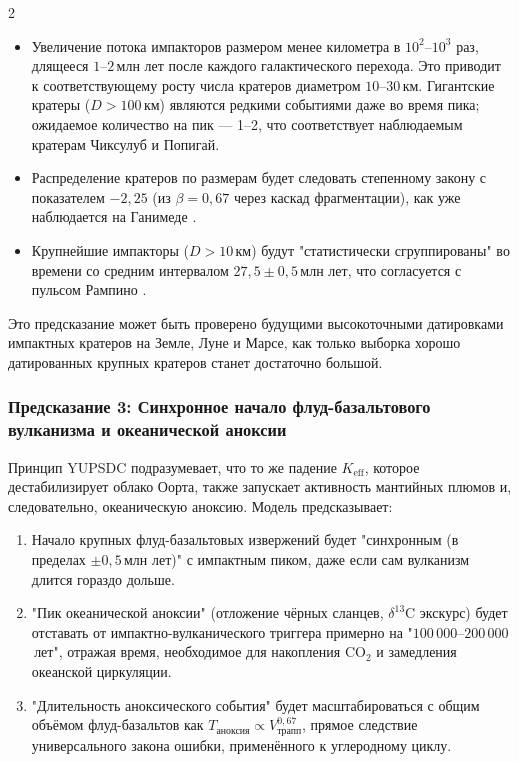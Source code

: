 \documentclass[11pt,a4paper]{article}
\begin{document}
\begin{multicols}{2}
		\begin{itemize}
			\item Увеличение потока импакторов размером менее километра в \(10^{2}\)–\(10^{3}\) раз, длящееся \(1\)–\(2\) млн лет после каждого галактического перехода. Это приводит к соответствующему росту числа кратеров диаметром \(10\)–\(30\) км. Гигантские кратеры (\(D>100\) км) являются редкими событиями даже во время пика; ожидаемое количество на пик — 1–2, что соответствует наблюдаемым кратерам Чиксулуб и Попигай.
			\item Распределение кратеров по размерам будет следовать степенному закону с показателем
			\(-2,25\) (из \(\beta=0,67\) через каскад фрагментации), как
			уже наблюдается на Ганимеде \cite{Schenk2004}.
			\item Крупнейшие импакторы (\(D>10\) км) будут "статистически
			сгруппированы" во времени со средним интервалом \(27,5 \pm 0,5\) млн лет,
			что согласуется с пульсом Рампино \cite{Rampino2021}.
		\end{itemize}
		
		Это предсказание может быть проверено будущими высокоточными датировками импактных кратеров на Земле, Луне и Марсе, как только выборка хорошо датированных крупных кратеров станет достаточно большой.
		
		\subsubsection{Предсказание 3: Синхронное начало флуд-базальтового вулканизма и океанической аноксии}
		
		Принцип YUPSDC подразумевает, что то же падение \(K_{\mathrm{eff}}\), которое
		дестабилизирует облако Оорта, также запускает активность мантийных плюмов и, следовательно,
		океаническую аноксию. Модель предсказывает:
		
		\begin{enumerate}
			\item Начало крупных флуд-базальтовых извержений будет "синхронным
			(в пределах \(\pm 0,5\) млн лет)" с импактным пиком, даже если сам вулканизм
			длится гораздо дольше.
			\item "Пик океанической аноксии" (отложение чёрных сланцев, \(\delta^{13}\)C
			экскурс) будет отставать от импактно-вулканического триггера примерно на
			"\(100\,000\)–\(200\,000\) лет", отражая время, необходимое для накопления
			CO\(_2\) и замедления океанской циркуляции.
			\item "Длительность аноксического события" будет масштабироваться с общим объёмом флуд-базальтов как \(T_{\text{аноксия}} \propto V_{\text{трапп}}^{0,67}\),
			прямое следствие универсального закона ошибки, применённого к углеродному циклу.
		\end{enumerate}
		

\end{multicols}
\end{document}
